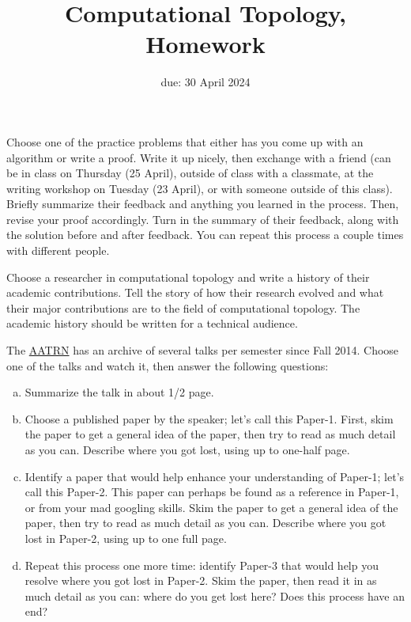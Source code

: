 \documentclass{article}
\title{Computational Topology, Homework \hwnum}
\author{\todo{your name here}}
\date{due: 30 April 2024}
\begin{document}
\maketitle



Choose one of the practice problems that either has you come up with an
algorithm or write a proof.  Write it up nicely, then exchange with a friend
(can be in class on Thursday (25 April), outside of class with a classmate, at
the writing workshop on Tuesday (23 April), or with someone outside of this
class). Briefly summarize their feedback and anything you learned in the
process.  Then, revise your proof accordingly.  Turn in the summary of their
feedback, along with the solution before and after feedback. You can repeat this
process a couple times with different people.


Choose a researcher in computational topology and write a history of their
academic contributions.  Tell the story of how their research evolved and what
their major contributions are to the field of computational topology.  The
academic history should be written for a technical audience.

The \href{https://topology.ima.umn.edu/seminars}{AATRN} has an archive of
several talks per semester since Fall 2014.  Choose one of the talks and
watch it, then answer the following questions:
\begin{enumerate}[(a)]
    \item Summarize the talk in about 1/2 page.
    \item Choose a published paper by the speaker; let's
        call this Paper-1.  First,
        skim the paper to get a general idea of the paper, then try to
        read as much detail as you can.  Describe where you got lost,
        using up to one-half page.
    \item Identify a paper that would help enhance your understanding of
        Paper-1; let's call this Paper-2.  This paper can perhaps be
        found as a reference in Paper-1, or from your mad googling
        skills. Skim the paper to get a general idea of the paper, then try to
        read as much detail as you can.  Describe where you got lost in
        Paper-2,
        using up to one full page.
    \item Repeat this process one more time: identify Paper-3 that would
        help you resolve where you got lost in Paper-2. Skim the paper,
        then read it in as much detail as you can: where do you get lost
        here?  Does this process have an end?
\end{enumerate}
\end{document}

